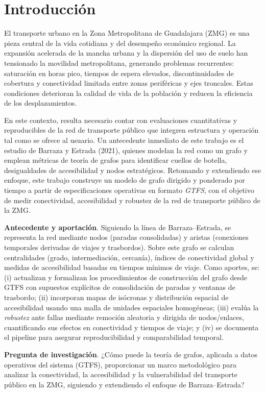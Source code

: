\chapter{Introducción}

    El transporte urbano en la Zona Metropolitana de Guadalajara (ZMG) es una pieza central de la vida cotidiana y del desempeño económico regional. La expansión acelerada de la mancha urbana y la dispersión del uso de suelo han tensionado la movilidad metropolitana, generando problemas recurrentes: saturación en horas pico, tiempos de espera elevados, discontinuidades de cobertura y conectividad limitada entre zonas periféricas y ejes troncales. Estas condiciones deterioran la calidad de vida de la población y reducen la eficiencia de los desplazamientos.

    En este contexto, resulta necesario contar con evaluaciones cuantitativas y reproducibles de la red de transporte público que integren estructura y operación tal como se ofrece al usuario. Un antecedente inmediato de este trabajo es el estudio de Barraza y Estrada (2021), quienes modelan la red como un grafo y emplean métricas de teoría de grafos para identificar cuellos de botella, desigualdades de accesibilidad y nodos estratégicos. Retomando y extendiendo ese enfoque, este trabajo construye un modelo de grafo dirigido y ponderado por tiempo a partir de especificaciones operativas en formato \textit{GTFS}, con el objetivo de medir conectividad, accesibilidad y robustez de la red de transporte público de la ZMG.

    \textbf{Antecedente y aportación}. Siguiendo la línea de Barraza–Estrada, se representa la red mediante nodos (paradas consolidadas) y aristas (conexiones temporales derivadas de viajes y trasbordos). Sobre este grafo se calculan centralidades (grado, intermediación, cercanía), índices de conectividad global y medidas de accesibilidad basadas en tiempos mínimos de viaje. Como aportes, se:
    (i) actualizan y formalizan los procedimientos de construcción del grafo desde GTFS con supuestos explícitos de consolidación de paradas y ventanas de trasbordo;
    (ii) incorporan mapas de isócronas y distribución espacial de accesibilidad usando una malla de unidades espaciales homogéneas;
    (iii) evalúa la \emph{robustez} ante fallas mediante remoción aleatoria y dirigida de nodos/enlaces, cuantificando sus efectos en conectividad y tiempos de viaje; y
    (iv) se documenta el pipeline para asegurar reproducibilidad y comparabilidad temporal.

    \textbf{Pregunta de investigación}. ¿Cómo puede la teoría de grafos, aplicada a datos operativos del sistema (GTFS), proporcionar un marco metodológico para analizar la conectividad, la accesibilidad y la vulnerabilidad del transporte público en la ZMG, siguiendo y extendiendo el enfoque de Barraza–Estrada?

